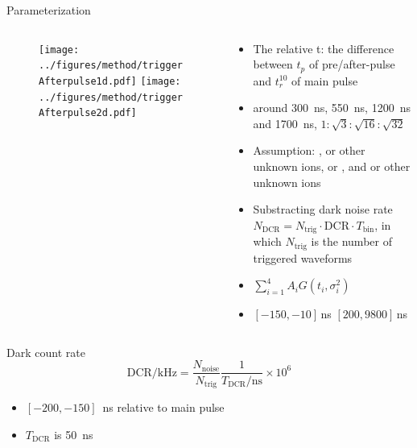 \documentclass[aspectratio=169]{beamer}
\begin{document}
\begin{frame}{Parameterization}
    \begin{columns}
        \begin{column}{0.45\textwidth}
            \begin{figure}
                \texttt{[image: ../figures/method/triggerAfterpulse1d.pdf]}
                \texttt{[image: ../figures/method/triggerAfterpulse2d.pdf]}
            \end{figure}
        \end{column}
        \begin{column}{0.55\textwidth}
            \begin{itemize}
                \item The relative t: the difference between $t_p$ of pre/after-pulse and $t_r^{10}$ of main pulse
                \item around \SI{300}{ns}, \SI{550}{ns}, \SI{1200}{ns} and \SI{1700}{ns}, $1:\sqrt{3}:\sqrt{16}:\sqrt{32}$
                \item Assumption: ,  or other unknown ions,  or , and  or other unknown ions
                \item Substracting dark noise rate $N_{\mathrm{DCR}}=N_{\mathrm{trig}}\cdot \mathrm{DCR}\cdot T_{\mathrm{bin}}$, in which $N_{\mathrm{trig}}$ is the number of triggered waveforms
                \item $\sum_{i=1}^{4}{A_iG(t_i,\sigma_i^2)}$
                \item $[-150,-10]$\,ns $[200,9800]$\,ns
            \end{itemize}
        \end{column}
    \end{columns}
\end{frame}

\begin{frame}{Dark count rate}
    \begin{equation}
        \mathrm{DCR/kHz} = \frac{N_{\mathrm{noise}}}{N_{\mathrm{trig}}}\frac{1}{T_{\mathrm{DCR}}/\mathrm{ns}}\times 10^{6}
    \end{equation}
    \begin{itemize}
        \item $[-200,-150]$\ ns relative to main pulse
        \item $T_{\mathrm{DCR}}$ is \SI{50}{ns}
    \end{itemize}
\end{frame}
\end{document}

